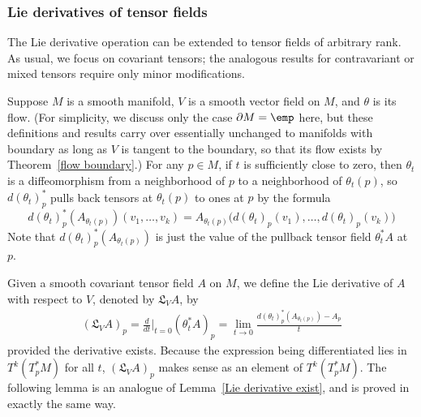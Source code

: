 \subsubsection{Lie derivatives of tensor fields}
The Lie derivative operation can be extended to tensor fields of arbitrary rank. As usual, we focus on covariant tensors; the analogous results for contravariant or mixed tensors require only minor modifications.\par 
Suppose $M$ is a smooth manifold, $V$ is a smooth vector field on $M$, and $\theta$ is its flow. (For simplicity, we discuss only the case $\partial M=\emp$ here, but these definitions and results carry over essentially unchanged to manifolds with boundary as long as $V$ is tangent to the boundary, so that its flow exists by Theorem~\ref{flow boundary}.) For any $p\in M$, if $t$ is sufficiently close to zero, then $\theta_t$ is a diffeomorphism from a neighborhood of $p$ to a neighborhood of $\theta_t(p)$, so $d(\theta_t)_p^*$ pulls back tensors at $\theta_t(p)$ to ones at $p$ by the formula
\[d(\theta_t)_p^*(A_{\theta_t(p)})(v_1,\dots,v_k)=A_{\theta_t(p)}\big(d(\theta_t)_p(v_1),\dots,d(\theta_t)_p(v_k)\big)\]
Note that $d(\theta_t)_p^*(A_{\theta_t(p)})$ is just the value of the pullback tensor field $\theta_t^*A$ at $p$.\par
Given a smooth covariant tensor field $A$ on $M$, we define the Lie derivative of $A$
with respect to $V$, denoted by $\mathfrak{L}_VA$, by
\begin{align}\label{tensor Lie def}
(\mathfrak{L}_VA)_p=\frac{d}{dt}\Big|_{t=0}(\theta^*_tA)_p=\lim_{t\to 0}\frac{d(\theta_t)_p^*(A_{\theta_t(p)})-A_p}{t}
\end{align}
provided the derivative exists. Because the expression being differentiated lies in $T^k(T^*_pM)$ for all $t$, $(\mathfrak{L}_VA)_p$ makes sense as an element of $T^k(T^*_pM)$. The following lemma is an analogue of Lemma~\ref{Lie derivative exist}, and is proved in exactly the same way.
